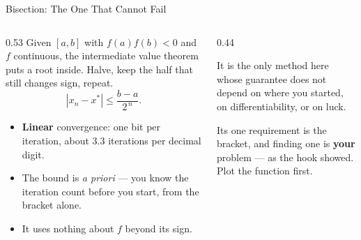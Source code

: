 \begin{frame}{Bisection: The One That Cannot Fail}
\begin{columns}[T]
\begin{column}{0.53\textwidth}
\small
Given $[a,b]$ with $f(a)f(b)<0$ and $f$ continuous, the intermediate value theorem puts a root inside. Halve, keep the half that still changes sign, repeat.
\[
  |x_n-x^{*}|\le \frac{b-a}{2^{\,n}} .
\]
\begin{itemize}\footnotesize
  \item \textbf{Linear} convergence: one bit per iteration, about $3.3$ iterations per decimal digit.
  \item The bound is \emph{a priori} --- you know the iteration count before you start, from the bracket alone.
  \item It uses nothing about $f$ beyond its sign.
\end{itemize}
\end{column}
\begin{column}{0.44\textwidth}
\begin{takeawaybox}[title=\textbf{Why it is still the right default}]\small
It is the only method here whose guarantee does not depend on where you started, on differentiability, or on luck.
\end{takeawaybox}
\medskip
\begin{cautionbox}\footnotesize
Its one requirement is the bracket, and finding one is \textbf{your} problem --- as the hook showed. Plot the function first.
\end{cautionbox}
\end{column}
\end{columns}
\end{frame}

